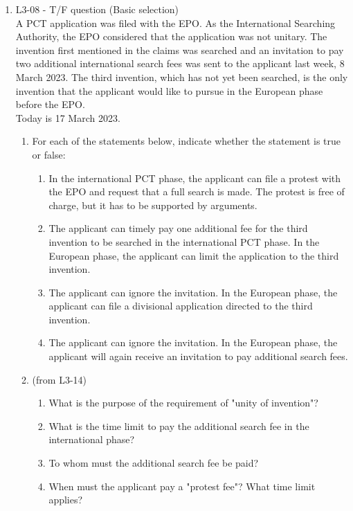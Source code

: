 \documentclass{report}
\begin{document}
\begin{enumerate}[label=\textbf{Question \arabic*}]
    \item %
    L3-08 - T/F question (Basic selection) \\
    A PCT application was filed with the EPO. As the International Searching Authority, the EPO considered that the application was not unitary. The invention first mentioned in the claims was searched and an invitation to pay two additional international search fees was sent to the applicant last week, 8 March 2023. The third invention, which has not yet been searched, is the only invention that the applicant would like to pursue in the European phase before the EPO. \\
    Today is 17 March 2023.
    \begin{enumerate}[label=(\alph*)]
        \item For each of the statements below, indicate whether the statement is true or false:
        \begin{enumerate}[label={(\alph{enumi}.\arabic*)}]
            \item In the international PCT phase, the applicant can file a protest with the EPO and request that a full search is made. The protest is free of charge, but it has to be supported by arguments.
            \item The applicant can timely pay one additional fee for the third invention to be searched in the international PCT phase. In the European phase, the applicant can limit the application to the third invention.
            \item The applicant can ignore the invitation. In the European phase, the applicant can file a divisional application directed to the third invention.
            \item The applicant can ignore the invitation. In the European phase, the applicant will again receive an invitation to pay additional search fees.
        \end{enumerate}
        
        \item (from L3-14)
        \begin{enumerate}[label={(\alph{enumi}.\arabic*)}]
            \item What is the purpose of the requirement of "unity of invention"?
            \item What is the time limit to pay the additional search fee in the international phase?
            \item To whom must the additional search fee be paid?
            \item When must the applicant pay a "protest fee"? What time limit applies?
        \end{enumerate}
    \end{enumerate}


\end{enumerate}
\end{document}
